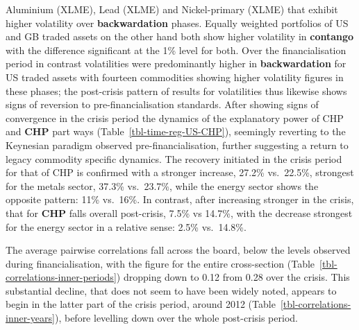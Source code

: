 \documentclass[
  authoryear,
  preprint,
  3p]{elsarticle}
\begin{document}
Aluminium (XLME), Lead (XLME) and Nickel-primary (XLME) that exhibit
higher volatility over \textbf{backwardation} phases. Equally weighted
portfolios of US and GB traded assets on the other hand both show higher
volatility in \textbf{contango} with the difference significant at the
1\% level for both. Over the financialisation period in contrast
volatilities were predominantly higher in \textbf{backwardation} for US
traded assets with fourteen commodities showing higher volatility
figures in these phases; the post-crisis pattern of results for
volatilities thus likewise shows signs of reversion to
pre-financialisation standards. After showing signs of convergence in
the crisis period the dynamics of the explanatory power of CHP and
\textbf{CHP} part ways (Table~\ref{tbl-time-reg-US-CHP}), seemingly
reverting to the Keynesian paradigm observed pre-financialisation,
further suggesting a return to legacy commodity specific dynamics. The
recovery initiated in the crisis period for that of CHP is confirmed
with a stronger increase, 27.2\% vs.~22.5\%, strongest for the metals
sector, 37.3\% vs.~23.7\%, while the energy sector shows the opposite
pattern: 11\% vs.~16\%. In contrast, after increasing stronger in the
crisis, that for \textbf{CHP} falls overall post-crisis, 7.5\% vs
14.7\%, with the decrease strongest for the energy sector in a relative
sense: 2.5\% vs.~14.8\%.

\medskip

The average pairwise correlations fall across the board, below the
levels observed during financialisation, with the figure for the entire
cross-section (Table~\ref{tbl-correlations-inner-periods}) dropping down
to 0.12 from 0.28 over the crisis. This substantial decline, that does
not seem to have been widely noted, appears to begin in the latter part
of the crisis period, around 2012
(Table~\ref{tbl-correlations-inner-years}), before levelling down over
the whole post-crisis period.

\medskip
\end{document}
